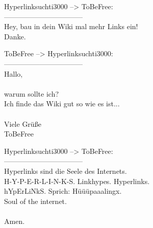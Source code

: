 \noindent \parbox{\textwidth}{

    \begin{footnotesize}
    \begin{itshape}

\noindent Hyperlinksuchti3000 --> ToBeFree:\\
\noindent ---------------------------------\\
\noindent Hey, bau in dein Wiki mal mehr Links ein!\\
\noindent Danke.\\

    \end{itshape}
    \end{footnotesize}

}


\noindent \parbox{\textwidth}{

    \begin{footnotesize}
    \begin{itshape}
    \begin{flushright}

\noindent ToBeFree --> Hyperlinksuchti3000:\\
\noindent ---------------------------------\\
\noindent Hallo,\\
\noindent ~\\
\noindent warum sollte ich?\\
\noindent Ich finde das Wiki gut so wie es ist...\\
\noindent ~\\
\noindent Viele Grüße\\
\noindent ToBeFree\\

    \end{flushright}
    \end{itshape}
    \end{footnotesize}

}

\noindent \parbox{\textwidth}{

    \begin{footnotesize}
    \begin{itshape}

\noindent Hyperlinksuchti3000 --> ToBeFree:\\
\noindent ---------------------------------\\
\noindent Hyperlinks sind die Seele des Internets.\\
\noindent H-Y-P-E-R-L-I-N-K-S. Linkhypes. Hyperlinks.\\
\noindent hYpErLiNkS. Sprich: Hüüüpaaalingx.\\
\noindent Soul of the internet.\\
\noindent ~\\
\noindent Amen.\\

    \end{itshape}
    \end{footnotesize}

}


